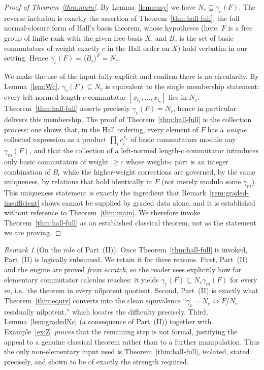 \documentclass{amsart}
\theoremstyle{definition}
\theoremstyle{remark}
\newtheorem{remark}{Remark}
\begin{document}
\begin{proof}[Proof of Theorem~\ref{thm:main}]
By Lemma~\ref{lem:easy} we have $N_c\subseteq\gamma_c(F)$. The reverse inclusion is
exactly the assertion of Theorem~\ref{thm:hall-full}, the full normal-closure form
of Hall's basis theorem, whose hypotheses (here: $F$ is a free group of finite
rank with the given free basis $X$, and $B_c$ is the set of basic commutators of
weight exactly $c$ in the Hall order on $X$) hold verbatim in our setting. Hence
$\gamma_c(F)=\langle B_c\rangle^{F}=N_c$.

We make the use of the input fully explicit and confirm there is no circularity.
By Lemma~\ref{lem:Wc}, $\gamma_c(F)\subseteq N_c$ is equivalent to the single
membership statement: every left-normed length-$c$ commutator
$[x_{i_1},\dots,x_{i_c}]$ lies in $N_c$. Theorem~\ref{thm:hall-full} asserts
precisely $\gamma_c(F)=N_c$, hence in particular delivers this membership. The
proof of Theorem~\ref{thm:hall-full} is the collection process: one shows that, in
the Hall ordering, every element of $F$ has a \emph{unique} collected expression as
a product $\prod_i c_i^{\,e_i}$ of basic commutators modulo any $\gamma_m(F)$, and
that the collection of a left-normed length-$c$ commutator introduces only basic
commutators of weight $\ge c$ whose weight-$c$ part is an integer combination of
$B_c$ while the higher-weight corrections are governed, by the same uniqueness, by
relations that hold identically in $F$ (not merely modulo some $\gamma_m$). This
uniqueness statement is exactly the ingredient that Remark~\ref{rem:graded-insufficient}
shows cannot be supplied by graded data alone, and it is established without
reference to Theorem~\ref{thm:main}. We therefore invoke
Theorem~\ref{thm:hall-full} as an established classical theorem, not as the
statement we are proving.
\end{proof}

\begin{remark}[On the role of Part~(II)]\label{rem:role}
Once Theorem~\ref{thm:hall-full} is invoked, Part~(II) is logically subsumed.
We retain it for three reasons. First, Part~(II) and the engine are proved
\emph{from scratch}, so the reader sees explicitly how far elementary commutator
calculus reaches: it yields $\gamma_c(F)\subseteq N_c\gamma_m(F)$ for every $m$,
i.e.\ the theorem in every nilpotent quotient. Second, Part~(II) is exactly what
Theorem~\ref{thm:equiv} converts into the clean equivalence
``$\gamma_c=N_c\iff F/N_c$ residually nilpotent,'' which locates the difficulty
precisely. Third, Lemma~\ref{lem:gradedNc} (a consequence of Part~(II)) together
with Example~\ref{ex:Z} \emph{proves} that the remaining step is not formal,
justifying the appeal to a genuine classical theorem rather than to a further
manipulation. Thus the only non-elementary input used is
Theorem~\ref{thm:hall-full}, isolated, stated precisely, and shown to be of
exactly the strength required.
\end{remark}
\end{document}
